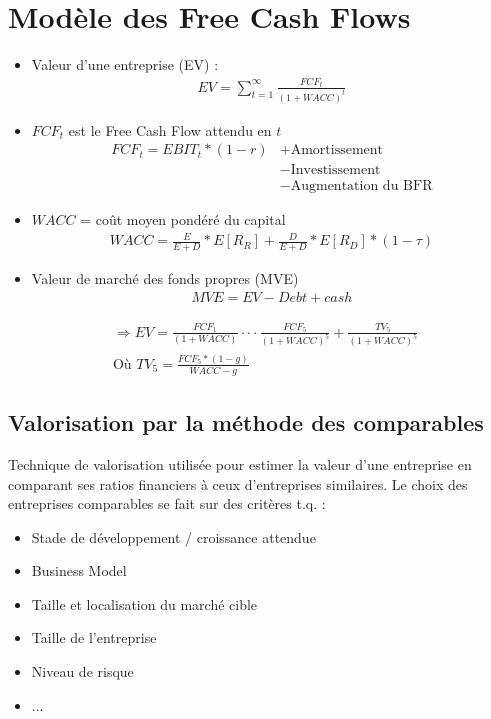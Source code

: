 \section{Modèle des Free Cash Flows}

\begin{itemize}
    \item Valeur d'une entreprise (EV) :
    \begin{align*}
        EV = \sum_{t=1}^{\infty} \frac{FCF_t}{(1 + WACC)^t}
    \end{align*}
    \item $FCF_t$ est le Free Cash Flow attendu en $t$
    \begin{align*}
        FCF_t = EBIT_t * (1-r) &+ \text{Amortissement} \\
                               &- \text{Investissement} \\
                               &- \text{Augmentation du BFR}
    \end{align*}
    \item $WACC$ = coût moyen pondéré du capital
    \begin{align*}
        WACC = \frac{E}{E+D} * E[R_R] + \frac{D}{E+D} * E[R_D] * (1-\tau)
    \end{align*}
    \item Valeur de marché des fonds propres (MVE)
    \begin{align*}
        MVE = EV - Debt + cash
    \end{align*}
\end{itemize}
\begin{align*}
    &\Longrightarrow EV = \frac{FCF_1}{(1 + WACC)} \cdot \cdot \cdot \frac{FCF_5}{(1 + WACC)^5} + \frac{TV_5}{(1 + WACC)^5}\\
    &\text{Où } TV_5 = \frac{FCF_5 * (1-g)}{WACC - g}
\end{align*}

\subsection{Valorisation par la méthode des comparables}

Technique de valorisation utilisée pour estimer la valeur d'une entreprise en comparant ses ratios financiers à ceux d'entreprises similaires. Le choix des entreprises comparables se fait sur des critères t.q. :
\begin{itemize}
    \item Stade de développement / croissance attendue
    \item Business Model
    \item Taille et localisation du marché cible
    \item Taille de l'entreprise
    \item Niveau de risque
    \item ...
\end{itemize}

